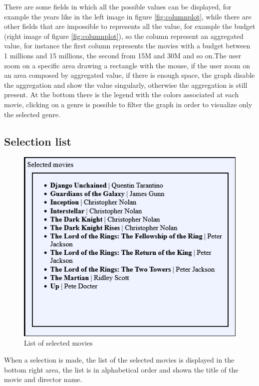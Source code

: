 \documentclass[]{article}
\begin{document}
There are some fields in which all the possible values can be displayed, for example the years like in the left image in figure \ref{fig:columnplot}, while there are other fields that are impossible to represents all the value, for example the budget (right image of figure \ref{fig:columnplot}), so the column represent an aggregated value, for instance the first column represents the movies with a budget between 1 millions and 15 millions, the second from 15M and 30M and so on.\newline The user zoom on a specific area drawing a rectangle with the mouse, if the user zoom on an area composed by aggregated value, if there is enough space, the graph disable the aggregation and show the value singularly, otherwise the aggregation is still present.\newline\newline
At the bottom there is the legend with the colors associated at each movie, clicking on a genre is possible to filter the graph in order to visualize only the selected genre.
\subsection{Selection list}
\begin{figure}[H]
	\centering
	\includegraphics[width=0.7\linewidth]{images/selection_list}
	\caption[Selection list]{List of selected movies}
	\label{fig:selectionlist}
\end{figure}
When a selection is made, the list of the selected movies is displayed in the bottom right area, the list is in alphabetical order and shown the title of the movie and director name.
\end{document}
